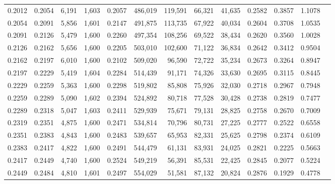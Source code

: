 \begin{tabular}{rrrrrrrrrrrrr}
0.2012 & 0.2054 &  6,191 & 1,603 &                                     0.2057 & 486,019 & 119,591 &  66,321 &  41,635 & 0.2582 & 0.3857 & 1.1078 \\
0.2054 & 0.2091 &  5,856 & 1,601 &                                     0.2147 & 491,875 & 113,735 &  67,922 &  40,034 & 0.2604 & 0.3708 & 1.0535 \\
0.2091 & 0.2126 &  5,479 & 1,600 &                                     0.2260 & 497,354 & 108,256 &  69,522 &  38,434 & 0.2620 & 0.3560 & 1.0028 \\
0.2126 & 0.2162 &  5,656 & 1,600 &                                     0.2205 & 503,010 & 102,600 &  71,122 &  36,834 & 0.2642 & 0.3412 & 0.9504 \\
0.2162 & 0.2197 &  6,010 & 1,600 &                                     0.2102 & 509,020 &  96,590 &  72,722 &  35,234 & 0.2673 & 0.3264 & 0.8947 \\
0.2197 & 0.2229 &  5,419 & 1,604 &                                     0.2284 & 514,439 &  91,171 &  74,326 &  33,630 & 0.2695 & 0.3115 & 0.8445 \\
0.2229 & 0.2259 &  5,363 & 1,600 &                                     0.2298 & 519,802 &  85,808 &  75,926 &  32,030 & 0.2718 & 0.2967 & 0.7948 \\
0.2259 & 0.2289 &  5,090 & 1,602 &                                     0.2394 & 524,892 &  80,718 &  77,528 &  30,428 & 0.2738 & 0.2819 & 0.7477 \\
0.2289 & 0.2318 &  5,047 & 1,603 &                                     0.2411 & 529,939 &  75,671 &  79,131 &  28,825 & 0.2758 & 0.2670 & 0.7009 \\
0.2319 & 0.2351 &  4,875 & 1,600 &                                     0.2471 & 534,814 &  70,796 &  80,731 &  27,225 & 0.2777 & 0.2522 & 0.6558 \\
0.2351 & 0.2383 &  4,843 & 1,600 &                                     0.2483 & 539,657 &  65,953 &  82,331 &  25,625 & 0.2798 & 0.2374 & 0.6109 \\
0.2383 & 0.2417 &  4,822 & 1,600 &                                     0.2491 & 544,479 &  61,131 &  83,931 &  24,025 & 0.2821 & 0.2225 & 0.5663 \\
0.2417 & 0.2449 &  4,740 & 1,600 &                                     0.2524 & 549,219 &  56,391 &  85,531 &  22,425 & 0.2845 & 0.2077 & 0.5224 \\
0.2449 & 0.2484 &  4,810 & 1,601 &                                     0.2497 & 554,029 &  51,581 &  87,132 &  20,824 & 0.2876 & 0.1929 & 0.4778 \\

\end{tabular}

